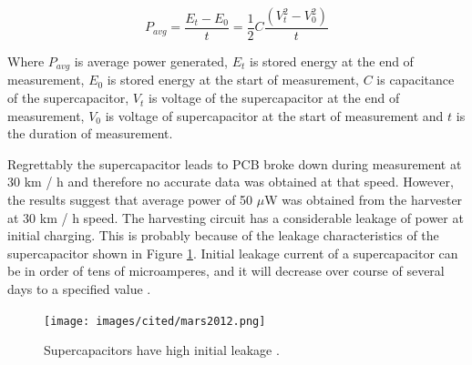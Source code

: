 \begin{equation} \label{eq:pwr_capacitance}
  P_{avg} = \frac{E_{t} - E_{0}}{t} = \frac{1}{2} C \frac{\left({V_{t}^2} - {V_{0}^2}\right)}{t}
\end{equation}

Where $P_{avg}$ is average power generated, $E_t$ is stored energy at the end of measurement, $E_0$ is stored energy at the start of measurement, $C$ is capacitance of the supercapacitor, $V_t$ is voltage of the supercapacitor at the end of measurement, $V_0$ is voltage of supercapacitor at the start of measurement and $t$ is the duration of measurement.

\begin{table}[htb]
\caption{\label{tbl:piezo_harvester_tyre_output} Measured values from tyre test setup, power is calculated with Equation \eqref{eq:pwr_capacitance}.}
\begin{center}
\end{center}
\end{table}

Regrettably the supercapacitor leads to PCB broke down during measurement at 30 km / h and therefore no accurate data was obtained at that speed. However, the results suggest that average power of 50 $\mu$W was obtained from the harvester at 30 km / h speed. The harvesting circuit has a considerable leakage of power at initial charging. This is probably because of the leakage characteristics of the supercapacitor shown in Figure \ref{fig:scap_leakage}. Initial leakage current of a supercapacitor can be in order of tens of microamperes, and it will decrease over course of several days to a specified value \cite{Mars2012}.

\begin{figure}[htb]
\begin{center}
\texttt{[image: images/cited/mars2012.png]}
\end{center}
\caption{\label{fig:scap_leakage} Supercapacitors have high initial leakage \cite{Mars2012}.}
\end{figure}

